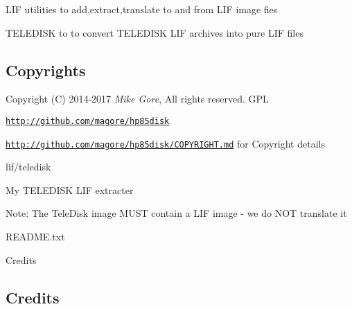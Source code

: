 
\begin{DoxyItemize}
\item L\+IF utilities to add,extract,translate to and from L\+IF image fies
\item T\+E\+L\+E\+D\+I\+SK to to convert T\+E\+L\+E\+D\+I\+SK L\+IF archives into pure L\+IF files 

 \subsection*{Copyrights}
\end{DoxyItemize}


\begin{DoxyItemize}
\item Copyright (C) 2014-\/2017 {\itshape Mike Gore}, All rights reserved. G\+PL
\begin{DoxyItemize}
\item \href{http://github.com/magore/hp85disk}{\tt http\+://github.\+com/magore/hp85disk}
\item \href{http://github.com/magore/hp85disk/COPYRIGHT.md}{\tt http\+://github.\+com/magore/hp85disk/\+C\+O\+P\+Y\+R\+I\+G\+H\+T.\+md} for Copyright details
\item lif/teledisk
\begin{DoxyItemize}
\item My T\+E\+L\+E\+D\+I\+SK L\+IF extracter
\begin{DoxyItemize}
\item Note\+: The Tele\+Disk image M\+U\+ST contain a L\+IF image -\/ we do N\+OT translate it
\end{DoxyItemize}
\item R\+E\+A\+D\+M\+E.\+txt
\begin{DoxyItemize}
\item Credits
\end{DoxyItemize}
\end{DoxyItemize}
\end{DoxyItemize}
\end{DoxyItemize}



 \subsection*{Credits}


